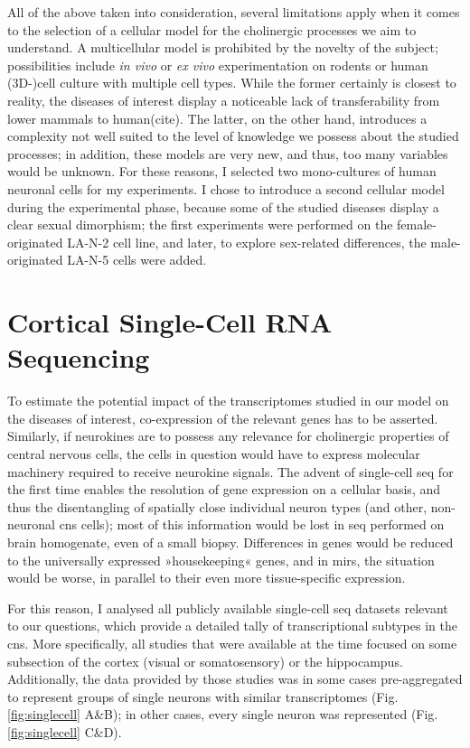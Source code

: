 All of the above taken into consideration, several limitations apply when it comes to the selection of a cellular model for the cholinergic processes we aim to understand. A multicellular model is prohibited by the novelty of the subject; possibilities include \textit{in vivo} or \textit{ex vivo} experimentation on rodents or human (3D-)cell culture with multiple cell types. While the former certainly is closest to reality, the diseases of interest display a noticeable lack of transferability from lower mammals to human(cite). The latter, on the other hand, introduces a complexity not well suited to the level of knowledge we possess about the studied processes; in addition, these models are very new, and thus, too many variables would be unknown. For these reasons, I selected two mono-cultures of human neuronal cells for my experiments. I chose to introduce a second cellular model during the experimental phase, because some of the studied diseases display a clear sexual dimorphism; the first experiments were performed on the female-originated LA-N-2 cell line, and later, to explore sex-related differences, the male-originated LA-N-5 cells were added.

\section{Cortical Single-Cell RNA Sequencing}
To estimate the potential impact of the transcriptomes studied in our model on the diseases of interest, co-expression of the relevant genes has to be asserted. Similarly, if neurokines are to possess any relevance for cholinergic properties of central nervous cells, the cells in question would have to express molecular machinery required to receive neurokine signals. The advent of single-cell \ac{seq} for the first time enables the resolution of gene expression on a cellular basis, and thus the disentangling of spatially close individual neuron types (and other, non-neuronal \ac{cns} cells); most of this information would be lost in \ac{seq} performed on brain homogenate, even of a small biopsy. Differences in genes would be reduced to the universally expressed »housekeeping« genes, and in \acp{mir}, the situation would be worse, in parallel to their even more tissue-specific expression.

For this reason, I analysed all publicly available single-cell \ac{seq} datasets relevant to our questions, which provide a detailed tally of transcriptional subtypes in the \ac{cns}. More specifically, all studies that were available at the time focused on some subsection of the cortex (visual or somatosensory) or the hippocampus. Additionally, the data provided by those studies was in some cases pre-aggregated to represent groups of single neurons with similar transcriptomes (Fig. \ref{fig:singlecell} A\&B\cite{Zeisel2015, Tasic2016}); in other cases, every single neuron was represented (Fig. \ref{fig:singlecell} C\&D\cite{Darmanis2015, Habib2016}). 

